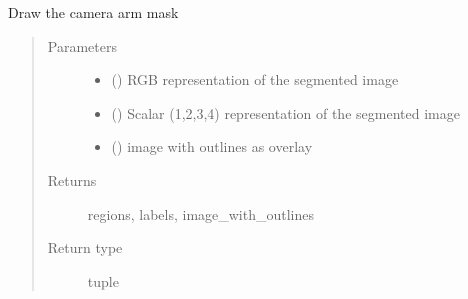 \documentclass[letterpaper,10pt,english]{sphinxmanual}
\begin{document}
\begin{fulllineitems}
\label{\detokenize{createregions:createregions.draw_arm}}
Draw the camera arm mask
\begin{quote}\begin{description}
\item[{Parameters}] \leavevmode\begin{itemize}
\item {} 
 () \textendash{} RGB representation of the segmented image

\item {} 
 () \textendash{} Scalar (1,2,3,4) representation of the segmented image

\item {} 
 () \textendash{} image with outlines as overlay

\end{itemize}

\item[{Returns}] \leavevmode
regions, labels, image\_with\_outlines

\item[{Return type}] \leavevmode
tuple

\end{description}\end{quote}

\end{fulllineitems}

\end{document}
